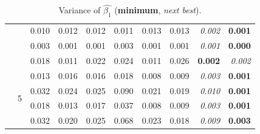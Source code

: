 \documentclass[authoryear, review, 11pt]{elsarticle}
\begin{document}
\begin{table}
\begin{center}
{\begin{tabular}{ccrrrrrrrr}
   &  & 0.010 & 0.012 & 0.012 & 0.011 & 0.013 & 0.013 & \emph{0.002} & \textbf{0.001} \\ 
   &  & 0.003 & 0.001 & 0.001 & 0.003 & 0.001 & 0.001 & \emph{0.001} & \textbf{0.000} \\ 
   &  & 0.018 & 0.011 & 0.022 & 0.024 & 0.011 & 0.026 & \textbf{0.002} & \emph{0.002} \\ 
  \cline{3-10}
   & \multirow{4}{*}{5} & 0.013 & 0.016 & 0.016 & 0.018 & 0.008 & 0.009 & \emph{0.003} & \textbf{0.001} \\ 
   &  & 0.032 & 0.024 & 0.025 & 0.090 & 0.021 & 0.019 & \emph{0.010} & \textbf{0.001} \\ 
   &  & 0.018 & 0.013 & 0.017 & 0.037 & 0.008 & 0.009 & \emph{0.003} & \textbf{0.001} \\ 
   &  & 0.032 & 0.020 & 0.025 & 0.068 & 0.023 & 0.018 & \emph{0.009} & \textbf{0.003} \\ 
  \end{tabular}}
\caption{Variance of $\hat{\beta_1}$ (\textbf{minimum}, \emph{next best}).\label{table:X1-var}}
\end{center}
\end{table}
\end{document}
